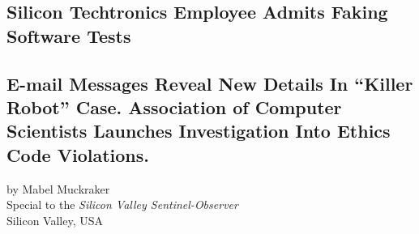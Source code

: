 \begin{center}
\section*{Silicon Techtronics Employee Admits Faking Software Tests}
\subsection*{E-mail Messages Reveal New Details In ``Killer Robot'' Case. Association of Computer Scientists Launches Investigation Into Ethics Code Violations.}
by Mabel Muckraker\\
Special to the \textit{Silicon Valley Sentinel-Observer}\\
Silicon Valley, USA
\end{center}